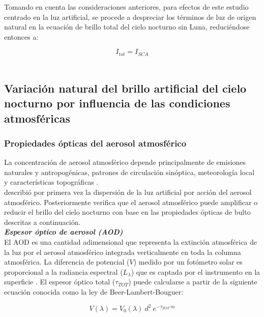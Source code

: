 Tomando en cuenta las consideraciones anteriores, para efectos de este estudio centrado en la luz artificial, se procede a despreciar los términos de luz de origen natural en la ecuación de brillo total del cielo nocturno sin Luna, reduciéndose entonces a:

\begin{equation}
I_{tot} = I_{SCA}
\end{equation}\\


\subsection{Variación natural del brillo artificial del cielo nocturno por influencia de las condiciones atmosféricas}

\subsubsection{Propiedades ópticas del aerosol atmosférico}
\label{subsubsec:propiedadesopticasaerosol}


La concentración de aerosol atmosférico depende principalmente de emisiones naturales y antropogénicas, patrones de circulación sinóptica, meteorología local y características topográficas \citep{Carabali2017}.\\

\cite{Garstang1991} describió por primera vez la dispersión de la luz artificial por acción del aerosol atmosférico. Posteriormente \cite{Kocifaj2007} verifica que el aerosol atmosférico puede amplificar o reducir el brillo del cielo nocturno con base en las propiedades ópticas de bulto descritas a continuación.\\

\textit{\textbf{Espesor óptico de aerosol (AOD)}}\\

El AOD es una cantidad adimensional que representa la extinción atmosférica de la luz por el aerosol atmosférico integrada verticalmente en toda la columna atmosférica. La diferencia de potencial ($V$) medido por un fotómetro solar es proporcional a la radiancia espectral ($L_{\lambda}$) que es captada por el instrumento en la superficie \citep{Holben1998}. El espesor óptico total ($\tau_{TOT}$) puede calcularse a partir de la siguiente ecuación conocida como la ley de Beer-Lambert-Bouguer:

\begin{equation}
V(\lambda) = V_0(\lambda)\:d^{2} \:e^{-\tau_{TOT}\: m}
\end{equation}

